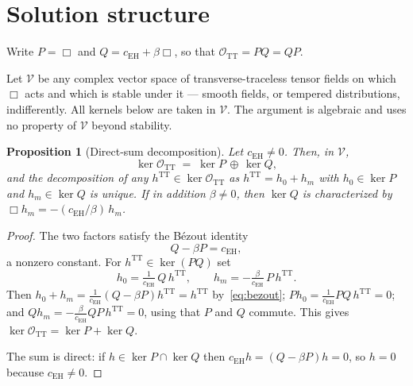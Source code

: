 \documentclass[12pt,a4paper]{article}
\newtheorem{proposition}[theorem]{Proposition}
\theoremstyle{definition}
\newcommand{\cEH}{c_{\mathrm{EH}}}
\newcommand{\hTT}{h^{\mathrm{TT}}}
\newcommand{\OTT}{\mathcal{O}_{\mathrm{TT}}}
\begin{document}
  \section{Solution structure}
    \label{sec:structure}

    Write $P = \Box$ and $Q = \cEH + \beta\Box$, so that $\OTT = PQ = QP$.

    Let $\mathcal{V}$ be any complex vector space of transverse-traceless tensor fields on which $\Box$ acts and
    which is stable under it --- smooth fields, or tempered distributions, indifferently. All kernels below are
    taken in $\mathcal{V}$. The argument is algebraic and uses no property of $\mathcal{V}$ beyond stability.

    \begin{proposition}[Direct-sum decomposition]
      \label{prop:decomposition}
      Let $\cEH \neq 0$. Then, in $\mathcal{V}$,
      \begin{equation}
        \ker \OTT \;=\; \ker P \,\oplus\, \ker Q ,
        \label{eq:directsum}
      \end{equation}
      and the decomposition of any $\hTT \in \ker\OTT$ as $\hTT = h_0 + h_m$ with $h_0 \in \ker P$ and
      $h_m \in \ker Q$ is unique.
      If in addition $\beta \neq 0$, then $\ker Q$ is characterized by $\Box h_m = -(\cEH/\beta)\,h_m$.
    \end{proposition}

    \begin{proof}
      The two factors satisfy the B\'ezout identity
      \begin{equation}
        Q - \beta P = \cEH ,
        \label{eq:bezout}
      \end{equation}
      a nonzero constant. For $\hTT \in \ker(PQ)$ set
      \[
        h_0 = \tfrac{1}{\cEH}\,Q\,\hTT ,
        \qquad
        h_m = -\tfrac{\beta}{\cEH}\,P\,\hTT .
      \]
      Then $h_0 + h_m = \tfrac{1}{\cEH}(Q - \beta P)\hTT = \hTT$ by~\eqref{eq:bezout};
      $P h_0 = \tfrac{1}{\cEH}PQ\,\hTT = 0$; and $Q h_m = -\tfrac{\beta}{\cEH}QP\,\hTT = 0$, using that $P$ and
      $Q$ commute. This gives $\ker\OTT = \ker P + \ker Q$.

      The sum is direct: if $h \in \ker P \cap \ker Q$ then $\cEH h = (Q - \beta P)h = 0$, so $h = 0$ because
      $\cEH \neq 0$.
    \end{proof}
\end{document}
